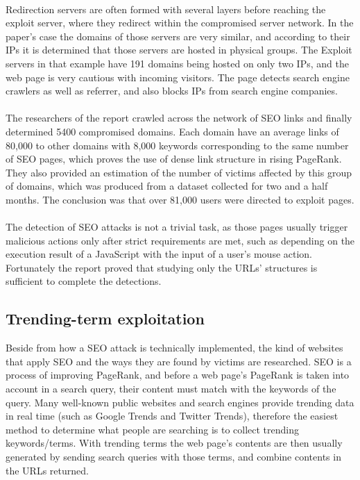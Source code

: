 \paragraph{}
Redirection servers are often formed
with several layers before reaching the exploit server, where they redirect
within the compromised server network. In the paper's case the domains of those
servers are very similar, and according to their IPs it is determined that those
servers are hosted in physical groups. The Exploit servers in that example have
191 domains being hosted on only two IPs, and the web page is very cautious with
incoming visitors. The page detects search engine crawlers as well as referrer,
and also blocks IPs from search engine companies. 
\paragraph{} 
The
researchers of the report crawled across the network of SEO links and finally
determined 5400 compromised domains. Each domain have an average links of
80,000 to other domains with 8,000 keywords corresponding to the same number of
SEO pages, which proves the use of dense link structure in rising PageRank. 
They also provided an estimation of the number of victims affected by this
group of domains, which was produced from a dataset collected for two and a
half months. The conclusion was that over 81,000 users were directed to exploit
pages.
\paragraph{} 
The detection of SEO attacks is not a trivial task, as
those pages usually trigger malicious actions only after strict requirements
are met, such as depending on the execution result of a JavaScript with the
input of a user's mouse action. Fortunately the report proved that studying only
the URLs' structures is sufficient to complete the detections. 
\subsection{Trending-term exploitation}
Beside from how a SEO attack is technically implemented, the kind 
of websites that apply SEO and the ways they are found by victims are researched. SEO is a 
process of improving PageRank, and before a web page's PageRank is taken into 
account in a search query, their content must match with the keywords of the query. Many
well-known public websites and search engines provide trending data in real
time (such as Google Trends and Twitter Trends), therefore the easiest method to
determine what people are searching is to collect trending keywords/terms. With
trending terms the web page's contents are then usually generated by sending
search queries with those terms, and combine contents in the URLs returned.
